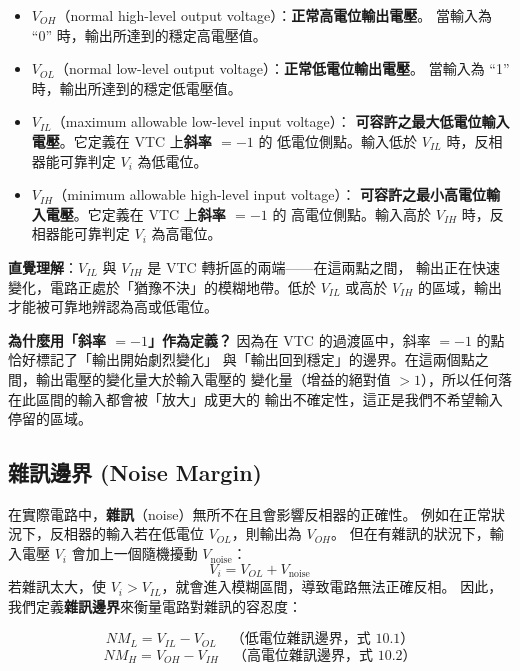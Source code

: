 \documentclass[12pt]{article}
\begin{document}
\begin{keybox}
\begin{itemize}[leftmargin=2.2em,itemsep=3pt]
  \item $V_{OH}$（normal high-level output voltage）：\textbf{正常高電位輸出電壓}。
    當輸入為 ``0'' 時，輸出所達到的穩定高電壓值。
  \item $V_{OL}$（normal low-level output voltage）：\textbf{正常低電位輸出電壓}。
    當輸入為 ``1'' 時，輸出所達到的穩定低電壓值。
  \item $V_{IL}$（maximum allowable low-level input voltage）：
    \textbf{可容許之最大低電位輸入電壓}。它定義在 VTC 上\textbf{斜率 $= -1$} 的
    低電位側點。輸入低於 $V_{IL}$ 時，反相器能可靠判定 $V_i$ 為低電位。
  \item $V_{IH}$（minimum allowable high-level input voltage）：
    \textbf{可容許之最小高電位輸入電壓}。它定義在 VTC 上\textbf{斜率 $= -1$} 的
    高電位側點。輸入高於 $V_{IH}$ 時，反相器能可靠判定 $V_i$ 為高電位。
\end{itemize}
\medskip
\textbf{直覺理解}：$V_{IL}$ 與 $V_{IH}$ 是 VTC 轉折區的兩端——在這兩點之間，
輸出正在快速變化，電路正處於「猶豫不決」的模糊地帶。低於 $V_{IL}$ 或高於 $V_{IH}$
的區域，輸出才能被可靠地辨認為高或低電位。
\end{keybox}

\textbf{為什麼用「斜率 $= -1$」作為定義？}
因為在 VTC 的過渡區中，斜率 $= -1$ 的點恰好標記了「輸出開始劇烈變化」
與「輸出回到穩定」的邊界。在這兩個點之間，輸出電壓的變化量大於輸入電壓的
變化量（增益的絕對值 $> 1$），所以任何落在此區間的輸入都會被「放大」成更大的
輸出不確定性，這正是我們不希望輸入停留的區域。

\subsection*{雜訊邊界 (Noise Margin)}

在實際電路中，\textbf{雜訊}（noise）無所不在且會影響反相器的正確性。
例如在正常狀況下，反相器的輸入若在低電位 $V_{OL}$，則輸出為 $V_{OH}$。
但在有雜訊的狀況下，輸入電壓 $V_i$ 會加上一個隨機擾動 $V_{\text{noise}}$：
\[
  V_i = V_{OL} + V_{\text{noise}}
\]
若雜訊太大，使 $V_i > V_{IL}$，就會進入模糊區間，導致電路無法正確反相。
因此，我們定義\textbf{雜訊邊界}來衡量電路對雜訊的容忍度：

\begin{formulabox}
\[
  NM_L = V_{IL} - V_{OL} \quad\text{（低電位雜訊邊界，式 10.1）}
\]
\[
  NM_H = V_{OH} - V_{IH} \quad\text{（高電位雜訊邊界，式 10.2）}
\]
\end{formulabox}
\end{document}
